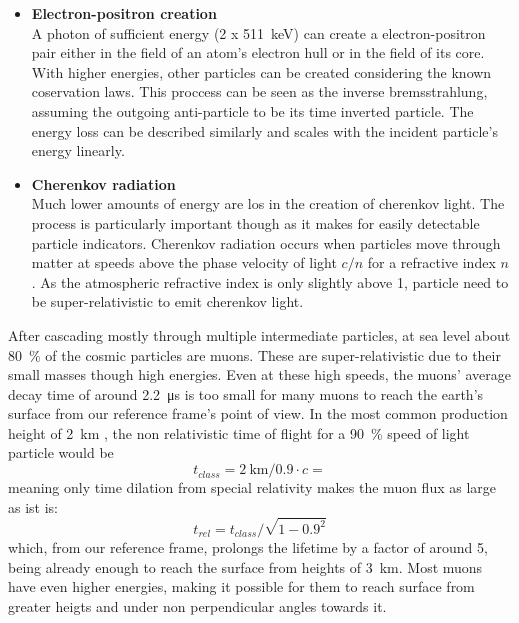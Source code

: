 \begin{itemize}
\begin{itemize}
		\item{\bf Electron-positron creation}\\
		A photon of sufficient energy (2 x \SI{511}{\kilo\electronvolt}) can create a electron-positron pair either in the field of an atom's electron hull or in the field of its core. With higher energies, other particles can be created considering the known coservation laws. 
		This proccess can be seen as the inverse bremsstrahlung, assuming the outgoing anti-particle to be its time inverted particle. The energy loss can be described similarly and scales with the incident particle's energy linearly.

		\item{\bf Cherenkov radiation}\\
		Much lower amounts of energy are los in the creation of cherenkov light. The process is particularly important though as it makes for easily detectable particle indicators. Cherenkov radiation occurs when particles move through matter at speeds above the phase velocity of light $c/n$ for a refractive index $n$. As the atmospheric refractive index is only slightly above 1, particle need to be super-relativistic to emit cherenkov light. 		
    \end{itemize}
    \end{itemize}
	After cascading mostly through multiple intermediate particles, at sea level about \SI{80}{\percent} of the cosmic particles are muons. These are super-relativistic due to their small masses though high energies. Even at these high speeds, the muons' average decay time of around \SI{2.2}{\micro\second} \cite{muonLifetime} is too small for many muons to reach the earth's surface from our reference frame's point of view. In the most common production height of \SI{2}{\kilo\meter} \cite{muonProductionHeight}, the non relativistic time of flight for a \SI{90}{\percent} speed of light particle would be
    \begin{equation}
	t_{class} = \SI{2}{\kilo\meter} / 0.9\cdot c = 
    \end{equation}
    meaning only time dilation from special relativity makes the muon flux as large as ist is:
    \begin{equation}
    	t_{rel} = t_{class} / \sqrt{1-0.9^2}
    \end{equation}
    which, from our reference frame, prolongs the lifetime by a factor of around 5, being already enough to reach the surface from heights of \SI{3}{\kilo\meter}. Most muons have even higher energies, making it possible for them to reach surface from greater heigts and under non perpendicular angles towards it.
